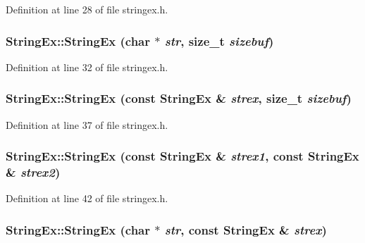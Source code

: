 Definition at line 28 of file stringex.h.\hypertarget{classStringEx_4f8c7c39cf9bdb89b0de4a23054bfa1d}{
\subsubsection[{StringEx}]{\setlength{\rightskip}{0pt plus 5cm}StringEx::StringEx (char $\ast$ {\em str}, \/  size\_\-t {\em sizebuf})}}
\label{classStringEx_4f8c7c39cf9bdb89b0de4a23054bfa1d}




Definition at line 32 of file stringex.h.\hypertarget{classStringEx_7647d27a1a03f22a23a7f3d863cf939b}{
\subsubsection[{StringEx}]{\setlength{\rightskip}{0pt plus 5cm}StringEx::StringEx (const {\bf StringEx} \& {\em strex}, \/  size\_\-t {\em sizebuf})}}
\label{classStringEx_7647d27a1a03f22a23a7f3d863cf939b}




Definition at line 37 of file stringex.h.\hypertarget{classStringEx_61301e17f26551eba75f9f005544fc0f}{
\subsubsection[{StringEx}]{\setlength{\rightskip}{0pt plus 5cm}StringEx::StringEx (const {\bf StringEx} \& {\em strex1}, \/  const {\bf StringEx} \& {\em strex2})}}
\label{classStringEx_61301e17f26551eba75f9f005544fc0f}




Definition at line 42 of file stringex.h.\hypertarget{classStringEx_fb83e36bbf4afa26fc531e2c9fefa0f7}{
\subsubsection[{StringEx}]{\setlength{\rightskip}{0pt plus 5cm}StringEx::StringEx (char $\ast$ {\em str}, \/  const {\bf StringEx} \& {\em strex})}}
\label{classStringEx_fb83e36bbf4afa26fc531e2c9fefa0f7}




